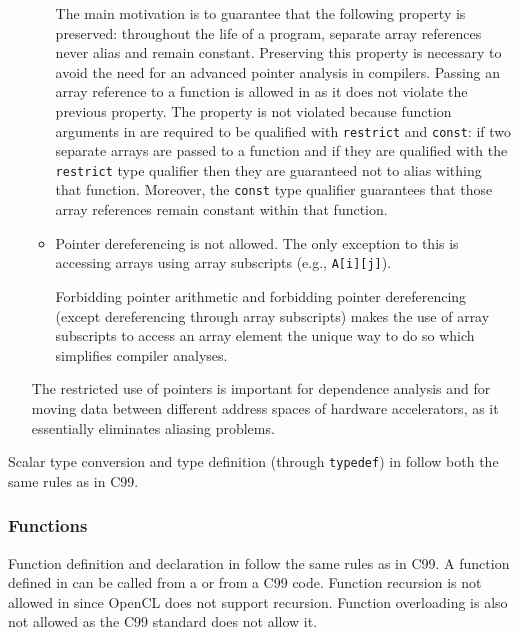 \begin{itemize}
\begin{itemize}
      The main motivation is to guarantee that the following property is
      preserved:
      throughout the life of a \pencil program, separate array references
      never alias and remain constant.
      Preserving this property is necessary to avoid the need for an
      advanced pointer
      analysis in \pencil compilers.
      Passing an array reference to a function is allowed in \pencil as it does not violate the previous
      property.  The property is not violated because function arguments in \pencil are required to be
      qualified with \lstinline!restrict! and \lstinline!const!:
      if two separate arrays are passed to a function and if they
      are qualified with the
      \lstinline!restrict! type qualifier then they are guaranteed
      not to alias withing that function.
      Moreover, the \lstinline!const! type qualifier guarantees
      that those array references remain constant within that function.

    \item Pointer dereferencing is not allowed.  The only exception to
      this is accessing arrays using array subscripts
      (e.g., \lstinline!A[i][j]!).

      Forbidding pointer arithmetic and forbidding pointer dereferencing
      (except dereferencing through array subscripts) makes the use of
      array subscripts to access an array element the unique way to do so
      which simplifies compiler analyses.
  \end{itemize}
    The restricted use of pointers is important for dependence analysis and
    for moving data between
    different address spaces of hardware accelerators, as it essentially
    eliminates aliasing problems.
 \end{itemize}

Scalar type conversion and type definition (through \lstinline!typedef!) in \pencil
follow both the same rules as in C99.

\subsubsection{Functions}
Function definition and declaration in \pencil follow the same
rules as in C99.
A function defined in \pencil can be called from a \pencil
or from a C99 code.
Function recursion is not allowed in \pencil since OpenCL does
not support recursion.
Function overloading is also not allowed as the C99 standard
does not allow it.



